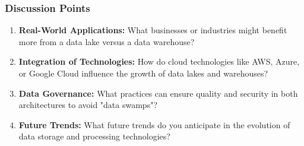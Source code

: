 \documentclass[aspectratio=169]{beamer}
\begin{document}
\begin{frame}[fragile]
    \frametitle{Discussion Points}
    \begin{enumerate}
        \item \textbf{Real-World Applications:} 
        What businesses or industries might benefit more from a data lake versus a data warehouse?
        
        \item \textbf{Integration of Technologies:} 
        How do cloud technologies like AWS, Azure, or Google Cloud influence the growth of data lakes and warehouses?
        
        \item \textbf{Data Governance:} 
        What practices can ensure quality and security in both architectures to avoid "data swamps"?
        
        \item \textbf{Future Trends:} 
        What future trends do you anticipate in the evolution of data storage and processing technologies?
    \end{enumerate}
\end{frame}
\end{document}
